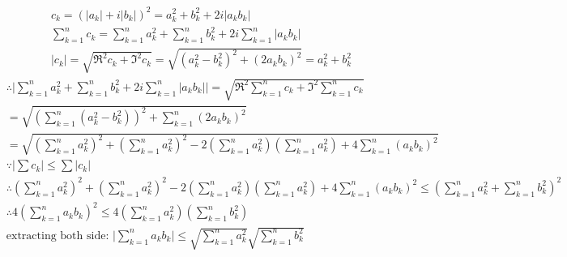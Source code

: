 \begin{solve}
	\begin{align*}
		&c_k = (|a_k| + i |b_k|)^2 = a_k^2 + b_k^2 + 2i |a_k b_k|\\
		&\sum_{k=1}^n c_k = \sum_{k=1}^n a_k^2 + \sum_{k=1}^n b_k^2 + 2i \sum_{k=1}^n |a_k b_k|\\
		&|c_k| = \sqrt{\Re^2 c_k + \Im^2 c_k} = \sqrt{(a_k^2-b_k^2)^2 + (2a_kb_k)^2} = a_k^2+b_k^2
	\end{align*}
	\begin{align*}
		&\therefore \Big| \sum_{k=1}^n a_k^2 + \sum_{k=1}^n b_k^2 + 2i \sum_{k=1}^n |a_k b_k| \Big|
		= \sqrt{\Re^2 \sum_{k=1}^n c_k + \Im^2 \sum_{k=1}^n c_k}\\
		&= \sqrt{(\sum_{k=1}^n (a_k^2-b_k^2))^2 + \sum_{k=1}^n (2a_kb_k)^2}\\
		&= \sqrt{(\sum_{k=1}^n a_k^2)^2 + (\sum_{k=1}^n a_k^2)^2 - 2(\sum_{k=1}^n a_k^2)(\sum_{k=1}^n a_k^2) + 4\sum_{k=1}^n (a_kb_k)^2}\\	
 		&\because |\sum c_k| \leqslant \sum|c_k| \\
 		&\therefore  (\sum_{k=1}^n a_k^2)^2 + (\sum_{k=1}^n a_k^2)^2 - 2(\sum_{k=1}^n a_k^2)(\sum_{k=1}^n a_k^2) + 4\sum_{k=1}^n (a_kb_k)^2 \leqslant (\sum_{k=1}^n a_k^2 + \sum_{k=1}^n b_k^2)^2\\
 		&\therefore 4(\sum_{k=1}^n a_k b_k)^2 \leqslant 4(\sum_{k=1}^n a_k^2) (\sum_{k=1}^n b_k^2)\\
 		& \text{extracting both side: } \Big|\sum_{k=1}^n a_k b_k\Big| \leqslant \sqrt{\sum_{k=1}^n a_k^2} \sqrt{\sum_{k=1}^n b_k^2}
\end{align*}
\end{solve}

